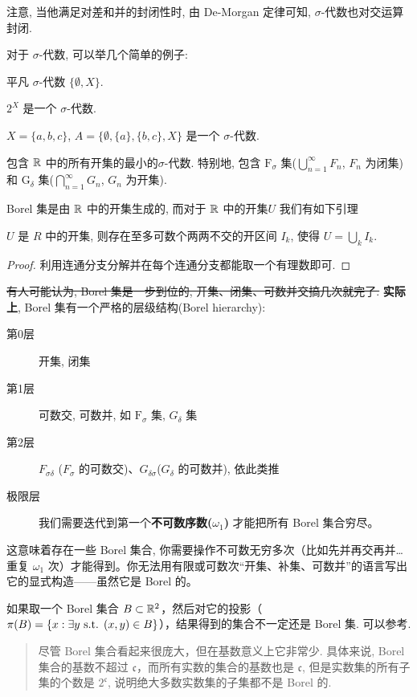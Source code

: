注意, 当他满足对差和并的封闭性时, 由 De-Morgan 定律可知, $\sigma$-代数也对交运算封闭.

对于 $\sigma$-代数, 可以举几个简单的例子:

\begin{example}
    平凡 $\sigma$-代数 $\{\emptyset, X\}$.
\end{example}
\begin{example}
    $2^{X}$ 是一个 $\sigma$-代数.
\end{example}
\begin{example}[一个有限集的例子]
    $X = \{a, b, c\}$, $A = \{\emptyset, \{a\}, \{b, c\}, X\}$ 是一个 $\sigma$-代数.
\end{example}
\begin{example}[Borel 集]
    包含 $\mathbb{R}$ 中的所有开集的最小的$\sigma$-代数. 特别地, 包含 $\mathrm{F}_{\sigma}$ 集($\bigcup_{n=1}^{\infty} F_n$, $F_n$ 为闭集) 和 $\mathrm{G}_{\delta}$ 集($\bigcap_{n=1}^{\infty} G_n$, $G_n$ 为开集).
\end{example}
Borel 集是由 $\mathbb{R}$ 中的开集生成的, 而对于 $\mathbb{R}$ 中的开集$U$ 我们有如下引理
\begin{lemma}\label{lem:open-set-eq-open-inner-union}
    $U$ 是 $R$ 中的开集, 则存在至多可数个两两不交的开区间 $I_k$, 使得 $U = \bigcup_k I_k$.
\end{lemma}
\begin{proof}
    利用连通分支分解并在每个连通分支都能取一个有理数即可.
\end{proof}

\sout{\texorpdfstring{有人可能认为, Borel 集是一步到位的, 开集、闭集、可数并交搞几次就完了.}{}} \textbf{实际上}, Borel 集有一个严格的层级结构(Borel hierarchy): 
\begin{description}
    \item[第0层] 开集, 闭集
    \item[第1层] 可数交, 可数并, 如 $\mathrm{F}_{\sigma}$ 集, $G_\delta$ 集
    \item[第2层] $F_{\sigma\delta}$ ($F_\sigma$ 的可数交)、$G_{\delta\sigma}$($G_\delta$ 的可数并), 依此类推
    \item[极限层] 我们需要迭代到第一个\textbf{不可数序数($\omega_1$)} 才能把所有 Borel 集合穷尽。
\end{description}
这意味着存在一些 Borel 集合, 你需要操作不可数无穷多次（比如先并再交再并…重复 $\omega_1$ 次）才能得到。你无法用有限或可数次“开集、补集、可数并”的语言写出它的显式构造——虽然它是 Borel 的。

\begin{remark}
    如果取一个 Borel 集合 $B \subset \mathbb{R}^2$，然后对它的投影（$\pi(B)=\{x:\exists y \text{ s.t. } (x,y)\in B\}$），结果得到的集合不一定还是 Borel 集.
    可以参考\cite{CunZaiFeiBorelDeJieXiJiSuslinShiRuHeGeiLebesgueJiuCuoDe}.
\end{remark}
\begin{quote} \label{quote:borel-cardinality}
    尽管 Borel 集合看起来很庞大，但在基数意义上它非常少.
    具体来说, Borel 集合的基数不超过 $\mathfrak{c}$，而所有实数的集合的基数也是 $\mathfrak{c}$, 但是实数集的所有子集的个数是 $2^{\mathfrak{c}}$, 说明绝大多数实数集的子集都不是 Borel 的.
\end{quote}

